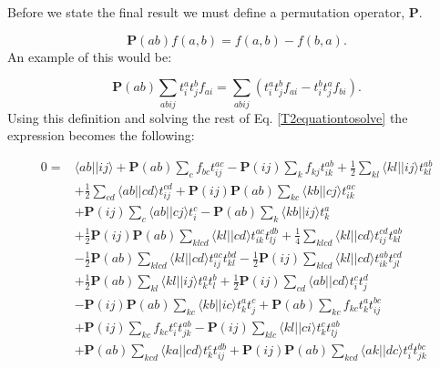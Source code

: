 Before we state the final result we must define a permutation operator, $\textbf{P}$.

\begin{equation}
\textbf{P}(ab) f(a,b) = f(a,b) - f(b,a) .
\end{equation}
An example of this would be:

\begin{equation}
\textbf{P}(ab) \sum_{abij} t_i^a t_j^b f_{ai} = \sum_{abij} \left( t_i^a t_j^b f_{ai} - t_i^b t_j^a f_{bi} \right) .
\end{equation} 
Using this definition and solving the rest of Eq. \eqref{T2equationtosolve} the expression becomes the following:

\begin{align}
0 = & \langle ab || ij \rangle
+ \textbf{P}(ab) \sum_c f_{bc} t_{ij}^{ac}
- \textbf{P}(ij) \sum_k f_{kj} t_{ik}^{ab}
+ \frac{1}{2} \sum_{kl} \langle kl||ij \rangle t_{kl}^{ab} \label{T2equation} \\ &
+ \frac{1}{2} \sum_{cd} \langle ab || cd \rangle t_{ij}^{cd}
+ \textbf{P}(ij) \textbf{P}(ab) \sum_{kc}
\langle kb||cj \rangle t_{ik}^{ac} \nonumber \\ &
+ \textbf{P}(ij) \sum_c \langle ab || cj \rangle t_i^c
- \textbf{P}(ab) \sum_k \langle kb || ij \rangle t_k^a
\nonumber \\ &
+ \frac{1}{2} \textbf{P}(ij) \textbf{P}(ab) \sum_{klcd}
\langle kl || cd \rangle t_{ik}^{ac} t_{lj}^{db} 
+ \frac{1}{4} \sum_{klcd} \langle kl || cd \rangle
t_{ij}^{cd} t_{kl}^{ab} \nonumber \\ &
-  \frac{1}{2} \textbf{P}(ab)\sum_{klcd} \langle kl || cd \rangle t_{ij}^{ac} t_{kl}^{bd}
- \frac{1}{2} \textbf{P}(ij) \sum_{klcd} \langle kl || cd \rangle t_{ik}^{ab} t_{jl}^{cd} \nonumber \\ &
+ \frac{1}{2} \textbf{P}(ab) \sum_{kl}
\langle kl || ij \rangle t_k^a t_l^b 
+ \frac{1}{2} \textbf{P}(ij) \sum_{cd} \langle ab || cd \rangle t_i^c t_j^d \nonumber \\ &
- \textbf{P}(ij) \textbf{P}(ab) \sum_{kc} \langle kb || ic \rangle t_k^a t_j^c
+  \textbf{P}(ab) \sum_{kc} f_{kc} t_k^a t_{ij}^{bc} 
\nonumber \\ &
+ \textbf{P}(ij) \sum_{kc} f_{kc} t_i^c t_{jk}^{ab}
- \textbf{P}(ij) \sum_{klc} \langle kl || ci \rangle t_k^c t_{lj}^{ab}  \nonumber \\ &
+ \textbf{P} (ab) \sum_{kcd} \langle ka || cd \rangle t_k^c t_{ij}^{db} 
+ \textbf{P}(ij) \textbf{P}(ab) \sum_{kcd} \langle ak || dc \rangle t_i^d t_{jk}^{bc} \nonumber \\ &

\end{align}
